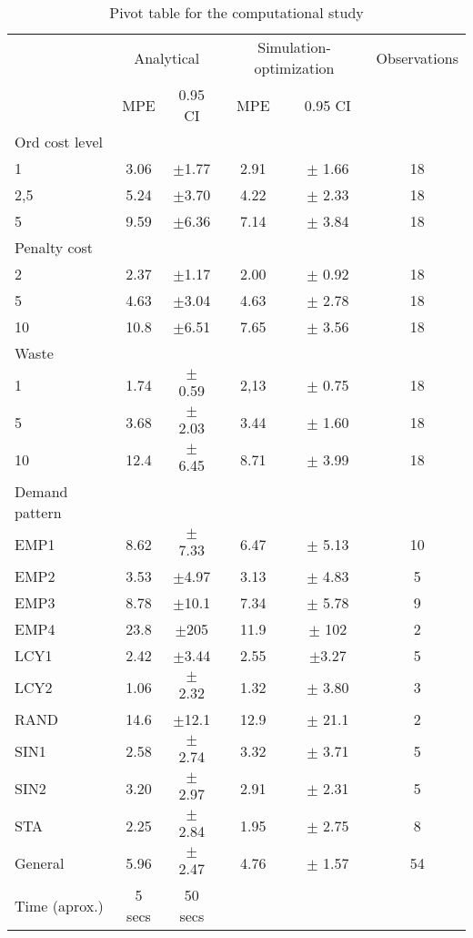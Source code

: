\documentclass{tPRS2e}
\begin{document}
\begin{table}[]
\centering
\caption{Pivot table for the computational study}
\label{tab:pivot}
\begin{tabular}{l|cc|cc|c}
              & \multicolumn{2}{|c}{Analytical} & \multicolumn{2}{|c}{Simulation-optimization} &\multicolumn{1}{|c}{Observations} \\ 
              & MPE  & 0.95 CI          & MPE    & 0.95 CI            \\ \hline
Ord cost level &     &                  &        & \\          
1             & 3.06 & $\pm$1.77		& 2.91   & $\pm$ 1.66  &18 \\
2,5           & 5.24 & $\pm$3.70		& 4.22   & $\pm$ 2.33  &18 \\
5             & 9.59 & $\pm$6.36		& 7.14   & $\pm$ 3.84  &18 \\ \hline
Penalty cost   & & &  &          \\
2             & 2.37 & $\pm$1.17		& 2.00	 & $\pm$ 0.92  &18 \\
5             & 4.63 & $\pm$3.04		& 4.63	 & $\pm$ 2.78  &18 \\
10            & 10.8 & $\pm$6.51		& 7.65	 & $\pm$ 3.56  &18 \\ \hline
Waste        & & &  &     \\  
1             & 1.74 & $\pm$ 0.59	& 2,13   &$\pm$  0.75  &18 \\
5             & 3.68 & $\pm$	2.03	& 3.44   &$\pm$  1.60  &18 \\
10            & 12.4 & $\pm$	6.45	& 8.71   &$\pm$  3.99  &18 \\ \hline
Demand pattern & & &  &      \\
EMP1          & 8.62    &$\pm$ 7.33 & 6.47  &$\pm$ 5.13 & 10 \\
EMP2          & 3.53 &$\pm$4.97  & 3.13 &$\pm$ 4.83     & 5 \\
EMP3          & 8.78  &$\pm$10.1  & 7.34  &$\pm$ 5.78   & 9  \\
EMP4       & 23.8 &$\pm$205          & 11.9 & $\pm$ 102 & 2   \\
LCY1          & 2.42 &$\pm$3.44   & 2.55 &$\pm$3.27     & 5 \\
LCY2          & 1.06 &$\pm$ 2.32  & 1.32 &$\pm$ 3.80    & 3\\
RAND          & 14.6 &$\pm$12.1   & 12.9&$\pm$ 21.1     & 2\\
SIN1          & 2.58 &$\pm$ 2.74   & 3.32 &$\pm$ 3.71   & 5\\
SIN2          & 3.20 &$\pm$ 2.97   & 2.91 &$\pm$ 2.31   & 5\\
STA           & 2.25 &$\pm$ 2.84  & 1.95 &$\pm$ 2.75    & 8\\ \hline
\hline
General       & 5.96  &$\pm$ 2.47  & 4.76   &$\pm$   1.57  & 54   \\ \hline
Time (aprox.) & 5 secs                         & 50 secs                       
\end{tabular}
\end{table}
\end{document}
